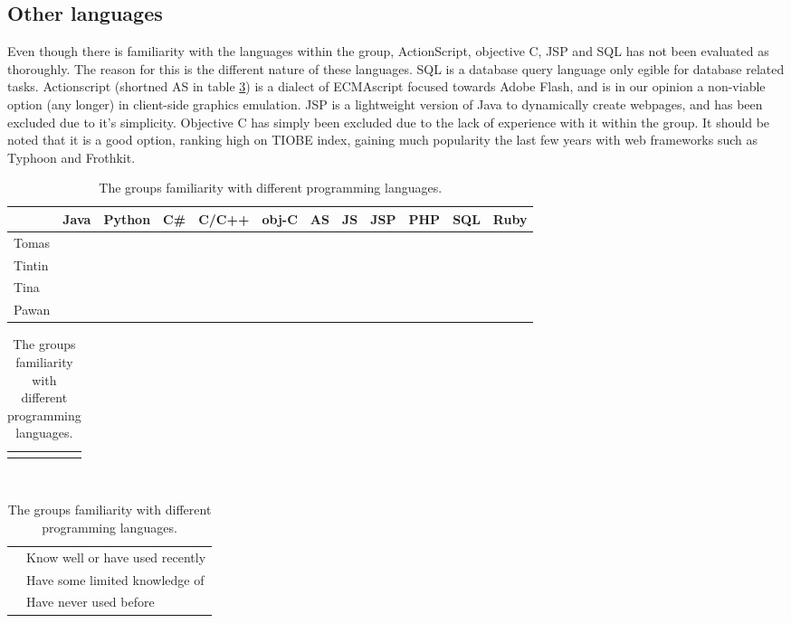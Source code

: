\documentclass{report}
\begin{document}
\subsection{Other languages}
Even though there is familiarity with the languages within the group, ActionScript, objective C, JSP and SQL has not been evaluated as thoroughly. The reason for this is the different nature of these languages. SQL is a database query language only egible for database related tasks. Actionscript (shortned AS in table \ref{tab:programming_languages}) is a dialect of ECMAscript focused towards Adobe Flash, and is in our opinion a non-viable option (any longer) in client-side graphics emulation. JSP is a lightweight version of Java to dynamically create webpages, and has been excluded due to it's simplicity. Objective C has simply been excluded due to the lack of experience with it within the group. It should be noted that it is a good option, ranking high on TIOBE index, gaining much popularity the last few years with web frameworks such as Typhoon\cite{website:typhoon} and Frothkit\cite{website:frothkit}.\\
\begin{table}[H]
\begin{tabular}{|l|c|c|c|c|c|c|c|c|c|c|c|}  \hline
& Java & Python & C\# & C/C++ & obj-C & AS & JS & JSP & PHP & SQL & Ruby \\ \hline 
Tomas &\cellcolor{green!25} &\cellcolor{green!25} &\cellcolor{green!25} &\cellcolor{red!25} &\cellcolor{red!25} &\cellcolor{red!25} &\cellcolor{green!25} &\cellcolor{yellow!25} &\cellcolor{red!25}&\cellcolor{green!25}  &\cellcolor{red!25} \\ 
Tintin &\cellcolor{green!25} &\cellcolor{yellow!25} &\cellcolor{green!25} &\cellcolor{red!25} &\cellcolor{red!25} &\cellcolor{green!25} &\cellcolor{green!25} &\cellcolor{yellow!25} &\cellcolor{green!25} &\cellcolor{green!25} &\cellcolor{yellow!25} \\ 
Tina &\cellcolor{green!25} &\cellcolor{red!25} &\cellcolor{red!25} &\cellcolor{red!25} &\cellcolor{red!25} &\cellcolor{red!25} &\cellcolor{red!25} &\cellcolor{yellow!25} &\cellcolor{red!25}&\cellcolor{green!25}  &\cellcolor{red!25} \\ 
Pawan &\cellcolor{green!25} &\cellcolor{yellow!25} &\cellcolor{red!25} &\cellcolor{yellow!25} &\cellcolor{red!25} &\cellcolor{red!25} &\cellcolor{green!25} &\cellcolor{yellow!25} &\cellcolor{red!25}& \cellcolor{green!25}  &\cellcolor{red!25} \\ 
  \hline
\end{tabular}
\begin{tabular}{ll} %
& 
\end{tabular} 
\\
\begin{tabular}{ll}
\cellcolor{green!25} & Know well or have used recently \\
\cellcolor{yellow!25} & Have some limited knowledge of \\
\cellcolor{red!25} & Have never used before \\ 
\end{tabular}
\label{tab:programming_languages}
\caption{The groups familiarity with different programming languages.}
\end{table}
\end{document}
